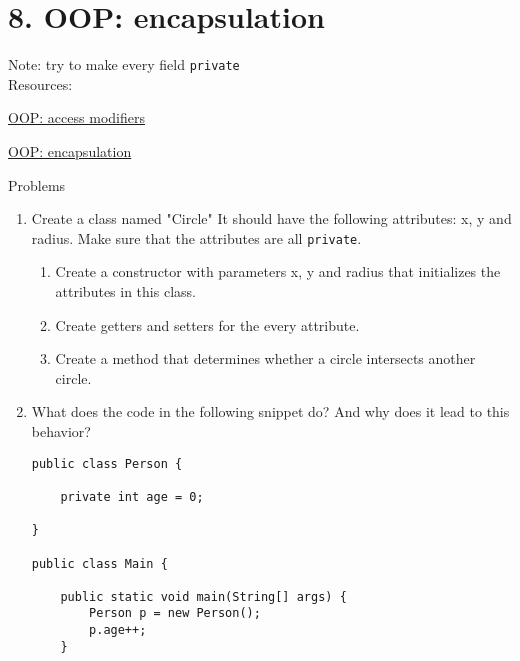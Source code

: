 \documentclass[12pt,letterpaper]{article}
\newcommand\hwnumber{8}
\begin{document}
\section*{\hwnumber. OOP: encapsulation}
Note: try to make every field \lstinline[]$private$ \\
Resources:
\begin{description}
    \item \href{https://www.w3schools.com/java/java_modifiers.asp}{OOP: access modifiers}
    \item \href{https://beginnersbook.com/2013/05/encapsulation-in-java/}{OOP: encapsulation}
\end{description}


Problems
\begin{enumerate}
\item
Create a class named "Circle" It should have the following attributes: x, y and radius. Make sure that the attributes are all
\lstinline[]$private$.
\begin{enumerate}
\item
Create a constructor with parameters x, y and radius that initializes the attributes in this class.
\item
Create getters and setters for the every attribute.
\item
Create a method that determines whether a circle intersects another circle.
\end{enumerate}

\newpage

\item
What does the code in the following snippet do? And why does it lead to this behavior?
\begin{lstlisting}
public class Person {

    private int age = 0;

}

public class Main {

    public static void main(String[] args) {
        Person p = new Person();
        p.age++;
    }


\end{lstlisting}
\end{enumerate}
\end{document}
